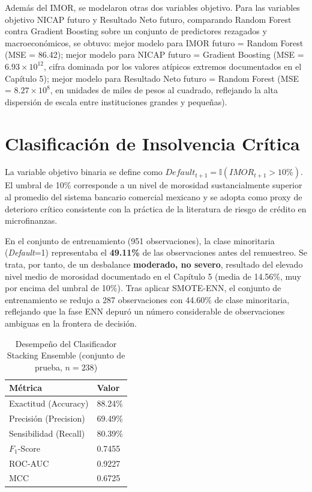 Además del IMOR, se modelaron otras dos variables objetivo. Para las variables objetivo NICAP futuro y Resultado Neto futuro, comparando Random Forest contra Gradient Boosting sobre un conjunto de predictores rezagados y macroeconómicos, se obtuvo: mejor modelo para IMOR futuro = Random Forest (MSE = 86.42); mejor modelo para NICAP futuro = Gradient Boosting (MSE = $6.93\times10^{12}$, cifra dominada por los valores atípicos extremos documentados en el Capítulo 5); mejor modelo para Resultado Neto futuro = Random Forest (MSE = $8.27\times10^{8}$, en unidades de miles de pesos al cuadrado, reflejando la alta dispersión de escala entre instituciones grandes y pequeñas).

\section{Clasificación de Insolvencia Crítica}
La variable objetivo binaria se define como $Default_{t+1} = \mathbb{I}(IMOR_{t+1}>10\%)$. El umbral de 10\% corresponde a un nivel de morosidad sustancialmente superior al promedio del sistema bancario comercial mexicano y se adopta como proxy de deterioro crítico consistente con la práctica de la literatura de riesgo de crédito en microfinanzas.

En el conjunto de entrenamiento (951 observaciones), la clase minoritaria (\textit{Default}=1) representaba el \textbf{49.11\%} de las observaciones antes del remuestreo. Se trata, por tanto, de un desbalance \textbf{moderado, no severo}, resultado del elevado nivel medio de morosidad documentado en el Capítulo 5 (media de 14.56\%, muy por encima del umbral de 10\%). Tras aplicar SMOTE-ENN, el conjunto de entrenamiento se redujo a 287 observaciones con 44.60\% de clase minoritaria, reflejando que la fase ENN depuró un número considerable de observaciones ambiguas en la frontera de decisión.

\begin{table}[H]
\centering
\caption{Desempeño del Clasificador Stacking Ensemble (conjunto de prueba, $n=238$)}
\label{tab:stacking}
\begin{tabularx}{\textwidth}{lX}
\toprule
\textbf{Métrica} & \textbf{Valor} \\
\midrule
Exactitud (Accuracy) & 88.24\% \\
Precisión (Precision) & 69.49\% \\
Sensibilidad (Recall) & 80.39\% \\
$F_1$-Score & 0.7455 \\
ROC-AUC & 0.9227 \\
MCC & 0.6725 \\
\bottomrule
\end{tabularx}
\end{table}

